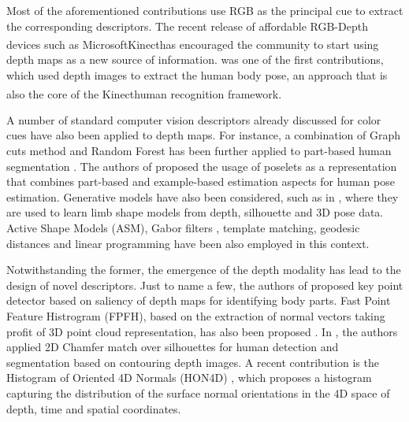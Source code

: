 \documentclass[10pt,twocolumn,letterpaper]{article}
\begin{document}
 Most of the aforementioned contributions use RGB as the principal cue to extract the corresponding descriptors. The recent release of affordable RGB-Depth devices such as Microsoft\textsuperscript\textregistered Kinect\textsuperscript\texttrademark has encouraged the community to start using depth maps as a new source of information. \cite{shotton2011depth} was one of the first contributions, which used depth images to extract the human body pose, an approach that is also the core of the Kinect\textsuperscript \texttrademark human recognition framework. 
 
 A number of standard computer vision descriptors already discussed for color cues have also been applied to depth maps. For instance, a combination of Graph cuts method and Random Forest has been further applied to part-based human segmentation  \cite{hernandez2012graph}. The authors of \cite{holt2011putting} proposed the usage of poselets as a representation that combines part-based and example-based estimation aspects for human pose estimation. Generative models have also been considered, such as in \cite{charles2011learning}, where they are used to learn limb shape models from depth, silhouette and 3D pose data. Active Shape Models (ASM), Gabor filters \cite{pugeault2011spelling}, template matching, geodesic distances \cite{schwarz2011estimating} and linear programming \cite{windheuser2011geometrically} have been also employed in this context.
 
Notwithstanding the former, the emergence of the depth modality has lead to the design of novel descriptors. Just to name a few, the authors of \cite{plagemann2010real} proposed key point detector based on saliency of depth maps for identifying body parts. Fast Point Feature Histrogram (FPFH), based on the extraction of normal vectors taking profit of 3D point cloud representation, has also been proposed \cite{rusu2009fast, rusu20113d, mogelmosetri}. In \cite{xia2011human}, the authors applied 2D Chamfer match over silhouettes for human detection and segmentation based on contouring depth images. A recent contribution is the Histogram of Oriented 4D Normals (HON4D) \cite{oreifej2013hon4d}, which proposes a histogram capturing the distribution of the surface normal orientations in the 4D space of depth, time and spatial coordinates.
 
\end{document}
